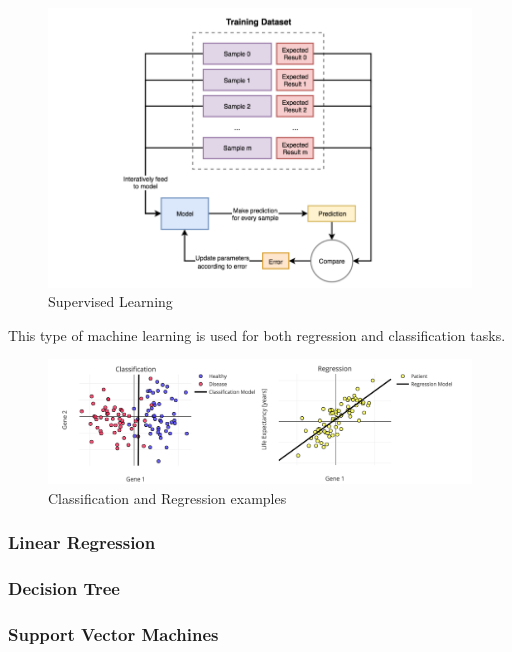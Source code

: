 \begin{figure}[h]
\centering
\includegraphics[width=\linewidth]{figures/Ch2/Supervised-Learning.png}
\caption{Supervised Learning}
\label{f:supervised-learning}
\end{figure}

This type of machine learning is used for both regression and classification tasks.

\begin{figure}[h]
\centering
\includegraphics[width=\linewidth]{figures/Ch2/Regression-Classification.png}
\caption{Classification and Regression examples}
\label{f:classification-regression}
\end{figure}

\subsubsection{Linear Regression}
\subsubsection{Decision Tree}
\subsubsection{Support Vector Machines}

